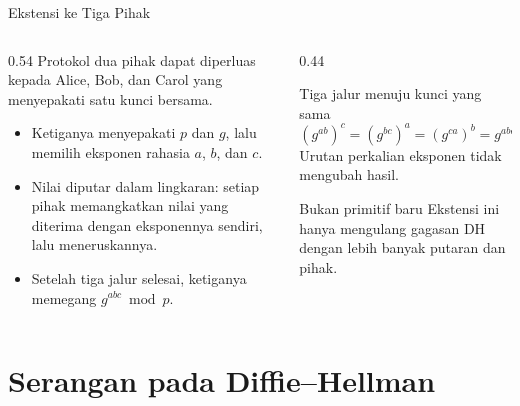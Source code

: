 \documentclass[aspectratio=169,11pt]{beamer}
\begin{document}
\begin{frame}{Ekstensi ke Tiga Pihak}
    \begin{columns}[T,onlytextwidth]
        \begin{column}{0.54\textwidth}
            \footnotesize
            Protokol dua pihak dapat diperluas kepada Alice, Bob, dan
            Carol yang menyepakati satu kunci bersama.
            \begin{itemize}
                \item Ketiganya menyepakati $p$ dan $g$, lalu memilih
                      eksponen rahasia $a$, $b$, dan $c$.
                \item Nilai diputar dalam lingkaran: setiap pihak
                      memangkatkan nilai yang diterima dengan eksponennya
                      sendiri, lalu meneruskannya.
                \item Setelah tiga jalur selesai, ketiganya memegang
                      $g^{abc} \bmod p$.
            \end{itemize}
        \end{column}
        \begin{column}{0.44\textwidth}
            \begin{block}{Tiga jalur menuju kunci yang sama}
                \footnotesize
                \[
                    (g^{ab})^{c} = (g^{bc})^{a} = (g^{ca})^{b}
                    = g^{abc} \pmod p .
                \]
                Urutan perkalian eksponen tidak mengubah hasil.
            \end{block}
            \begin{alertblock}{Bukan primitif baru}
                \footnotesize
                Ekstensi ini hanya mengulang gagasan DH dengan lebih banyak
                putaran dan pihak.
            \end{alertblock}
        \end{column}
    \end{columns}
\end{frame}

\section{Serangan pada Diffie--Hellman}
\end{document}
